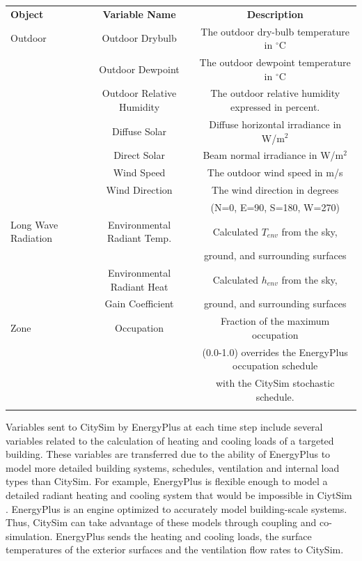 \documentclass{tBPS2e}
\theoremstyle{plain}
\theoremstyle{definition}
\theoremstyle{remark}
\begin{document}
\begin{table}[H]
{\begin{tabular}[l]{@{}lcc}\toprule
  \bf{Object} &  \bf{Variable Name} & \bf{Description} \\
\colrule
  Outdoor & Outdoor Drybulb & The outdoor dry-bulb temperature in $^{\circ}\mathrm{C}$ \\
 & Outdoor Dewpoint & The outdoor dewpoint temperature in $^{\circ}\mathrm{C}$ \\
 & Outdoor Relative Humidity & The outdoor relative humidity expressed in percent. \\
 & Diffuse Solar & Diffuse horizontal irradiance in W/m$^2$ \\
 & Direct Solar & Beam normal irradiance in W/m$^2$ \\
 & Wind Speed & The outdoor wind speed in m/s \\
 & Wind Direction & The wind direction in degrees\\&&  (N=0, E=90, S=180, W=270) \\
 \hline
 Long Wave Radiation & Environmental Radiant Temp. & Calculated $T_{env}$ from the sky,\\&& ground, and surrounding surfaces \\
 & Environmental Radiant Heat  & Calculated $h_{env}$ from the sky,\\
 & Gain Coefficient & ground, and surrounding surfaces \\
 
 \hline
Zone & Occupation & Fraction of the maximum occupation\\&& (0.0-1.0) overrides the EnergyPlus occupation schedule\\&&  with the CitySim stochastic schedule. \\
\botrule
\end{tabular}}
\label{FMUimports}
\end{table}

Variables sent to CitySim by EnergyPlus at each time step include several
variables related to the calculation of heating and cooling loads of a
targeted building. These variables are transferred due to the ability of
EnergyPlus to model more detailed building systems, schedules, ventilation and
internal load types than CitySim. For example, EnergyPlus is flexible enough
to model a detailed radiant heating and cooling system that would be
impossible in CiytSim \citep{barbara:2015tz}. EnergyPlus is an engine
optimized to accurately model building-scale systems. Thus, CitySim can take 
advantage of these models through coupling and co-simulation. EnergyPlus sends
the heating and cooling loads, the surface temperatures of the exterior
surfaces and the ventilation flow rates to CitySim.
\end{document}
